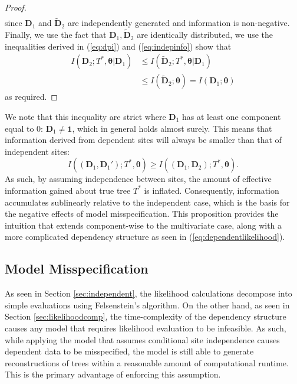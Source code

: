 \begin{proof}
\begin{align}
\end{align}
since $\mathbf{D}_1$ and $\tilde{\mathbf{D}}_2$ are independently generated and information is non-negative. Finally, we use the fact that  $\mathbf{D}_1,\tilde{\mathbf{D}}_2$ are identically distributed, we use the inequalities derived in (\ref{eq:dpi}) and (\ref{eq:indepinfo}) show that 
\begin{align}
    I(\mathbf{D}_2; T^*, \boldsymbol{\theta} | \mathbf{D}_1) &\leq I(\tilde{\mathbf{D}}_2;T^*, \boldsymbol{\theta}|\mathbf{D}_1) \\
    &\leq I(\tilde{\mathbf{D}}_2; \boldsymbol{\theta}) = I(\mathbf{D}_1; \boldsymbol{\theta})
\end{align}
as required.
\end{proof}

We note that this inequality are strict where $\mathbf{D}_1$ has at least one component equal to $0$: $\mathbf{D}_1 \neq \mathbf{1}$, which in general holds almost surely. This means that information derived from dependent sites will always be smaller than that of independent sites:
\begin{equation}
    I((\mathbf{D}_1, \mathbf{D}_1'); T^*, \boldsymbol{\theta}) \geq I((\mathbf{D}_1, \mathbf{D}_2); T^*, \boldsymbol{\theta}).
\end{equation}
As such, by assuming independence between sites, the amount of effective information gained about true tree $T^*$ is inflated. Consequently, information accumulates sublinearly relative to the independent case, which is the basis for the negative effects of model misspecification. This proposition provides the intuition that extends component-wise to the multivariate case, along with a more complicated dependency structure as seen in (\ref{eq:dependentlikelihood}).

\subsection{Model Misspecification}
\label{sec:misspecification}
As seen in Section \ref{sec:independent}, the likelihood calculations decompose into simple evaluations using Felsenstein's algorithm. On the other hand, as seen in Section \ref{sec:likelihoodcomp}, the time-complexity of the dependency structure causes any model that requires likelihood evaluation to be infeasible. As such, while applying the model that assumes conditional site independence causes dependent data to be misspecified, the model is still able to generate reconstructions of trees within a reasonable amount of computational runtime. This is the primary advantage of enforcing this assumption.

